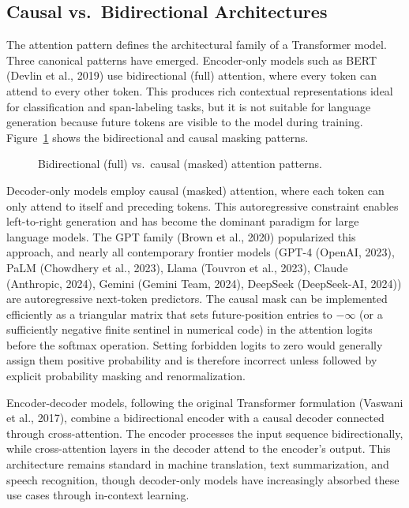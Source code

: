 \documentclass[10pt,twocolumn]{article}
\begin{document}
\subsection{Causal vs.~Bidirectional Architectures}\label{causal-vs.-bidirectional-architectures}

The attention pattern defines the architectural family of a Transformer model. Three canonical patterns have emerged. Encoder-only models such as BERT (Devlin et al., 2019) use bidirectional (full) attention, where every token can attend to every other token. This produces rich contextual representations ideal for classification and span-labeling tasks, but it is not suitable for language generation because future tokens are visible to the model during training. Figure~\ref{fig:masks} shows the bidirectional and causal masking patterns.

\begin{figure}[!tbp]
\centering
\resizebox{0.65\textwidth}{!}{}
\caption{Bidirectional (full) vs.\ causal (masked) attention patterns.}\label{fig:masks}
\end{figure}

Decoder-only models employ causal (masked) attention, where each token can only attend to itself and preceding tokens. This autoregressive constraint enables left-to-right generation and has become the dominant paradigm for large language models. The GPT family (Brown et al., 2020) popularized this approach, and nearly all contemporary frontier models (GPT-4 (OpenAI, 2023), PaLM (Chowdhery et al., 2023), Llama (Touvron et al., 2023), Claude (Anthropic, 2024), Gemini (Gemini Team, 2024), DeepSeek (DeepSeek-AI, 2024)) are autoregressive next-token predictors. The causal mask can be implemented efficiently as a triangular matrix that sets future-position entries to $-\infty$ (or a sufficiently negative finite sentinel in numerical code) in the attention logits before the softmax operation. Setting forbidden logits to zero would generally assign them positive probability and is therefore incorrect unless followed by explicit probability masking and renormalization.

Encoder-decoder models, following the original Transformer formulation (Vaswani et al., 2017), combine a bidirectional encoder with a causal decoder connected through cross-attention. The encoder processes the input sequence bidirectionally, while cross-attention layers in the decoder attend to the encoder's output. This architecture remains standard in machine translation, text summarization, and speech recognition, though decoder-only models have increasingly absorbed these use cases through in-context learning.
\end{document}

